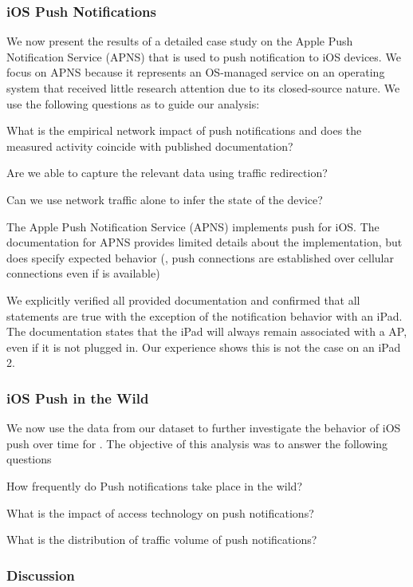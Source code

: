 \subsubsection{iOS Push Notifications}

We now present the results of a detailed case study on the Apple Push Notification Service (APNS) that is used to push notification to iOS devices. 
We focus on APNS because it represents an OS-managed service on an operating system that received little research attention due to its closed-source nature. 
We use the following questions as to guide our analysis: 
\begin{packedenumerate}
\item What is the empirical network impact of push notifications and does the measured activity coincide with published documentation? 
\item Are we able to capture the relevant data using traffic redirection?
\item Can we use network traffic alone to infer the state of the device?
\end{packedenumerate}

The Apple Push Notification Service (APNS) implements push for iOS. 
The documentation for APNS provides limited details about the implementation, but does specify expected behavior (\eg, push
connections are established over cellular connections even if \wifi is available)

We explicitly verified all provided documentation and confirmed that all statements are true with the exception of the notification behavior with an iPad. 
The documentation states that the iPad will always remain associated with a \wifi AP, even if it is not plugged in. Our
experience shows this is not the case on an iPad 2.


\subsubsection{iOS Push in the Wild}

We now use the data from our \moball dataset to further investigate the behavior of iOS push over time for . 
The objective of this analysis was to answer the following questions
\begin{packedenumerate}
\item How frequently do Push notifications take place in the wild?
\item What is the impact of access technology on push notifications?
\item What is the distribution of traffic volume of push notifications?	
\item {}
\item {}
\end{packedenumerate}


\subsubsection{Discussion}

